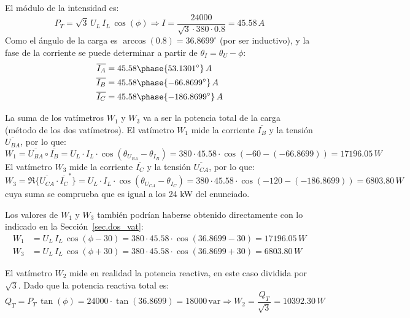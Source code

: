 \begin{example}
El módulo de la intensidad es:
\begin{equation*}
    P_T=\sqrt{3}\,U_L\,I_L\,\cos(\phi)\Rightarrow I=\dfrac{24000}{\sqrt{3}\cdot 380\cdot 0.8}=45.58\,A
\end{equation*}
Como el ángulo de la carga es $\arccos{(0.8)}=36.8699^\circ$ (por ser inductivo), y la fase de la corriente se puede determinar a partir de $\theta_I=\theta_U-\phi$:
\begin{align*}
    \overline{I_A}&=45.58\phase{53.1301^\circ}\,A\\
    \overline{I_B}&=45.58\phase{-66.8699^\circ}\,A\\
    \overline{I_C}&=45.58\phase{-186.8699^\circ}\,A
\end{align*}

La suma de los vatímetros $W_1$ y $W_3$ va a ser la potencia total de la carga (método de los dos vatímetros). El vatímetro $W_1$ mide la corriente $\overline{I_B}$ y la tensión $\overline{U_{BA}}$, por lo que: \begin{equation*}
    W_1=\overline{U_{BA}}\circ \overline{I_B}=U_{L}\cdot I_L\cdot \cos{(\theta_{U_{BA}}-\theta_{I_B})}= 380\cdot 45.58\cdot \cos(-60-(-66.8699))=17196.05\,W
\end{equation*}
El vatímetro $W_3$ mide la corriente $\overline{I_C}$ y la tensión $\overline{U_{CA}}$, por lo que: \begin{equation*}
    W_3=\Re\{\overline{U_{CA}}\cdot \overline{I_C}^*\}=U_{L}\cdot I_L\cdot \cos{(\theta_{U_{CA}}-\theta_{I_C})}= 380\cdot 45.58\cdot \cos(-120-(-186.8699))=6803.80\,W
\end{equation*}
cuya suma se comprueba que es igual a los 24 kW del enunciado.
\begin{remark}
    Los valores de $W_1$ y $W_3$ también podrían haberse obtenido directamente con lo indicado en la Sección~\ref{sec.dos_vat}:
    \begin{align*}
        W_1&=U_L\,I_L\,\cos(\phi-30)=380\cdot 45.58\cdot \cos(36.8699-30)=17196.05\,W\\
        W_3&=U_L\,I_L\,\cos(\phi+30)=380\cdot 45.58\cdot \cos(36.8699+30)=6803.80\,W
    \end{align*}
\end{remark}

El vatímetro $W_2$ mide en realidad la potencia reactiva, en este caso dividida por $\sqrt{3}$. Dado que la potencia reactiva total es:
\begin{equation*}
    Q_T=P_T\,\tan(\phi)=24000\cdot\tan(36.8699)=18000 \,\text{var}\Rightarrow W_2=\dfrac{Q_T}{\sqrt{3}}=10392.30\,W
\end{equation*}


\end{example}
